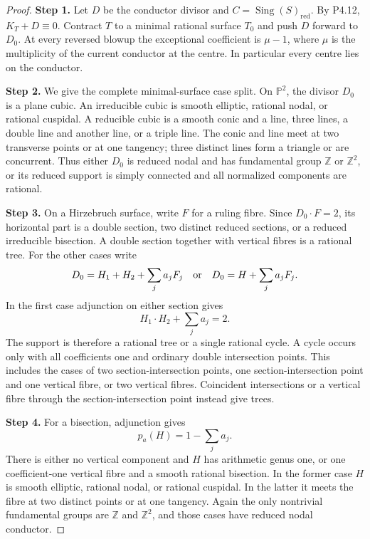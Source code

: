 \begin{proof}
\noindent\textbf{Step 1.} Let $D$ be the conductor divisor and
$C=\operatorname{Sing}(S)_{\mathrm{red}}$. By P4.12,
$K_T+D\equiv0$. Contract $T$ to a minimal rational surface
$T_0$ and push $D$ forward to $D_0$. At every reversed
blowup the exceptional coefficient is $\mu-1$, where
$\mu$ is the multiplicity of the current conductor at the
centre. In particular every centre lies on the conductor.

\noindent\textbf{Step 2.} We give the complete minimal-surface case split. On
$\mathbb P^2$, the divisor $D_0$ is a plane cubic. An
irreducible cubic is smooth elliptic, rational nodal, or
rational cuspidal. A reducible cubic is a smooth conic
and a line, three lines, a double line and another line,
or a triple line. The conic and line meet at two
transverse points or at one tangency; three distinct
lines form a triangle or are concurrent. Thus either
$D_0$ is reduced nodal and has fundamental group
$\mathbb Z$ or $\mathbb Z^2$, or its reduced support is
simply connected and all normalized components are
rational.

\noindent\textbf{Step 3.} On a Hirzebruch surface, write $F$ for a ruling fibre.
Since $D_0\cdot F=2$, its horizontal part is a double
section, two distinct reduced sections, or a reduced
irreducible bisection. A double section together with
vertical fibres is a rational tree. For the other cases
write
\[
 D_0=H_1+H_2+\sum_j a_jF_j
 \quad\hbox{or}\quad
 D_0=H+\sum_j a_jF_j.
\]
In the first case adjunction on either section gives
\[
 H_1\cdot H_2+\sum_j a_j=2.
\]
The support is therefore a rational tree or a single
rational cycle. A cycle occurs only with all coefficients
one and ordinary double intersection points. This
includes the cases of two section-intersection points,
one section-intersection point and one vertical fibre,
or two vertical fibres. Coincident intersections or a
vertical fibre through the section-intersection point
instead give trees.

\noindent\textbf{Step 4.} For a bisection, adjunction gives
\[
 p_a(H)=1-\sum_j a_j.
\]
There is either no vertical component and $H$ has
arithmetic genus one, or one coefficient-one vertical
fibre and a smooth rational bisection. In the former
case $H$ is smooth elliptic, rational nodal, or rational
cuspidal. In the latter it meets the fibre at two distinct
points or at one tangency. Again the only nontrivial
fundamental groups are $\mathbb Z$ and $\mathbb Z^2$,
and those cases have reduced nodal conductor.


\end{proof}
